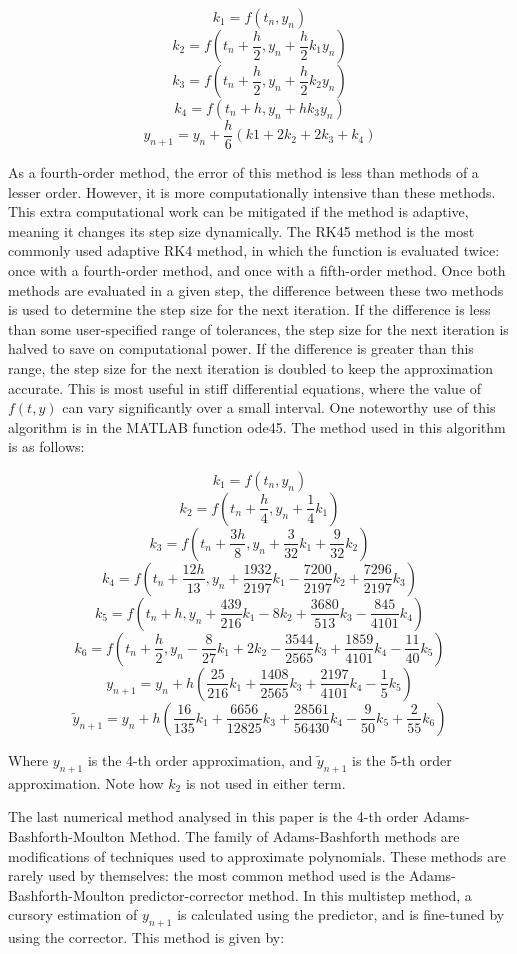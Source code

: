 \documentclass[11pt]{article}
\begin{document}
$$k_{1}=f(t_{n}, y_{n})$$
$$k_{2}=f\left(t_{n}+\frac{h}{2}, y_{n}+\frac{h}{2}k_{1}y_{n}\right)$$
$$k_{3}=f\left(t_{n}+\frac{h}{2}, y_{n}+\frac{h}{2}k_{2}y_{n}\right)$$
$$k_{4}=f(t_{n}+h, y_{n}+hk_{3}y_{n})$$
$$y_{n+1}=y_{n}+\frac{h}{6}(k{1}+2k_{2}+2k_{3}+k_{4})$$

As a fourth-order method, the error of this method is less than methods of a lesser
order. However, it is more computationally intensive than these methods. This
extra computational work can be mitigated if the method is adaptive, meaning it
changes its step size dynamically. The RK45 method is the most commonly used
adaptive RK4 method, in which the function is evaluated twice: once with a
fourth-order method, and once with a fifth-order method. Once both methods are 
evaluated in a given step, the difference between these two methods is used to
determine the step size for the next iteration. If the difference is less than some
user-specified range of tolerances, the step size for the next iteration is halved
to save on computational power. If the difference is greater than this range, the
step size for the next iteration is doubled to keep the approximation accurate.
This is most useful in stiff differential equations, where the value of $f(t,y)$
can vary significantly over a small interval.
One noteworthy use of this algorithm is in the MATLAB function ode45. The method
used in this algorithm is as follows:

$$k_{1}=f(t_{n}, y_{n})$$
$$k_{2}=f\left(t_{n}+\frac{h}{4}, y_{n}+\frac{1}{4}k_{1}\right)$$
$$k_{3}=f\left(t_{n}+\frac{3h}{8}, y_{n}+\frac{3}{32}k_{1}+\frac{9}{32}k_{2}\right)$$
$$k_{4}=f\left(t_{n}+\frac{12h}{13}, y_{n}+\frac{1932}{2197}k_{1}-\frac{7200}{2197}k_{2}+\frac{7296}{2197}k_{3}\right)$$
$$k_{5}=f\left(t_{n}+h, y_{n}+\frac{439}{216}k_{1}-8k_{2}+\frac{3680}{513}k_{3}-\frac{845}{4101}k_{4}\right)$$
$$k_{6}=f\left(t_{n}+\frac{h}{2}, y_{n}-\frac{8}{27}k_{1}+2k_{2}-\frac{3544}{2565}k_{3}+\frac{1859}{4101}k_{4}-\frac{11}{40}k_{5}\right)$$
$$y_{n+1}=y_{n}+h\left(\frac{25}{216}k_{1}+\frac{1408}{2565}k_{3}+\frac{2197}{4101}k_{4}-\frac{1}{5}k_{5}\right)$$
$$\tilde y_{n+1}=y_{n}+h\left(\frac{16}{135}k_{1}+\frac{6656}{12825}k_{3}+\frac{28561}{56430}k_{4}-\frac{9}{50}k_{5}+\frac{2}{55}k_{6}\right)$$

Where $y_{n+1}$ is the 4-th order approximation, and $\tilde y_{n+1}$ is the 5-th
order approximation. Note how $k_{2}$ is not used in either term. 

The last numerical method analysed in this paper is the 4-th order
Adams-Bashforth-Moulton Method. The family of Adams-Bashforth methods are modifications
of techniques used to approximate polynomials. These methods are rarely used by
themselves: the most common method used is the Adams-Bashforth-Moulton
predictor-corrector method. In this multistep method, a cursory
estimation of $y_{n+1}$ is calculated using the predictor, and is fine-tuned by
using the corrector. This method is given by:
\end{document}
